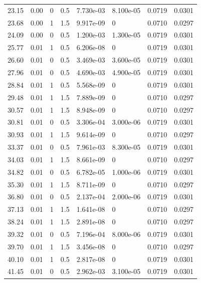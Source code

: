 \documentclass[preview]{standalone}
\begin{document}
{{\begin{tabular}{L{1.2cm}C{1.2cm} C{0.3cm}C{0.5cm} C{1.4cm}C{1.4cm} C{1.4cm}C{1.4cm}}
  23.15  &  0.00  & 0     & 0.5 &  7.730e-03  & 8.100e-05  & 0.0719 &  0.0301   \\ 
  23.68  &  0.00  & 1     & 1.5 &  9.917e-09  & 0  & 0.0710 &  0.0297   \\ 
  24.09  &  0.00  & 0     & 0.5 &  1.200e-03  & 1.300e-05  & 0.0719 &  0.0301   \\ 
  25.77  &  0.01  & 1     & 0.5 &  6.206e-08  & 0  & 0.0719 &  0.0301   \\ 
  26.60  &  0.01  & 0     & 0.5 &  3.469e-03  & 3.600e-05  & 0.0719 &  0.0301   \\ 
  27.96  &  0.01  & 0     & 0.5 &  4.690e-03  & 4.900e-05  & 0.0719 &  0.0301   \\ 
  28.84  &  0.01  & 1     & 0.5 &  5.568e-09  & 0  & 0.0719 &  0.0301   \\ 
  29.48  &  0.01  & 1     & 1.5 &  7.889e-09  & 0  & 0.0710 &  0.0297   \\ 
  30.57  &  0.01  & 1     & 1.5 &  8.948e-09  & 0  & 0.0710 &  0.0297   \\ 
  30.81  &  0.01  & 0     & 0.5 &  3.306e-04  & 3.000e-06  & 0.0719 &  0.0301   \\ 
  30.93  &  0.01  & 1     & 1.5 &  9.614e-09  & 0  & 0.0710 &  0.0297   \\ 
  33.37  &  0.01  & 0     & 0.5 &  7.961e-03  & 8.300e-05  & 0.0719 &  0.0301   \\ 
  34.03  &  0.01  & 1     & 1.5 &  8.661e-09  & 0  & 0.0710 &  0.0297   \\ 
  34.82  &  0.01  & 0     & 0.5 &  6.782e-05  & 1.000e-06  & 0.0719 &  0.0301   \\ 
  35.30  &  0.01  & 1     & 1.5 &  8.711e-09  & 0  & 0.0710 &  0.0297   \\ 
  36.80  &  0.01  & 0     & 0.5 &  2.137e-04  & 2.000e-06  & 0.0719 &  0.0301   \\ 
  37.13  &  0.01  & 1     & 1.5 &  1.641e-08  & 0  & 0.0710 &  0.0297   \\ 
  38.24  &  0.01  & 1     & 1.5 &  2.891e-08  & 0  & 0.0710 &  0.0297   \\ 
  39.32  &  0.01  & 0     & 0.5 &  7.196e-04  & 8.000e-06  & 0.0719 &  0.0301   \\ 
  39.70  &  0.01  & 1     & 1.5 &  3.456e-08  & 0  & 0.0710 &  0.0297   \\ 
  40.10  &  0.01  & 1     & 0.5 &  2.817e-08  & 0  & 0.0719 &  0.0301   \\ 
  41.45  &  0.01  & 0     & 0.5 &  2.962e-03  & 3.100e-05  & 0.0719 &  0.0301   \\ 

\end{tabular}}}
\end{document}
